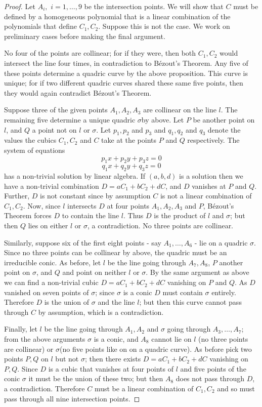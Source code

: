 \documentclass{article}
\theoremstyle{remark}
\begin{document}
\begin{proof}
Let $A_i,$ $i=1,\ldots ,9$ be the intersection points. We will show that $C$ must be defined by a homogeneous polynomial that is a linear combination of the polynomials that define $C_1,C_2$. Suppose this is not the case. We work on preliminary cases before making the final argument.
\par
No four of the points are collinear; for if they were, then both $C_1,C_2$ would intersect the line four times, in contradiction to Bézout's Theorem. Any five of these points determine a quadric curve by the above proposition. This curve is unique; for if two different quadric curves shared these same five points, then they would again contradict Bézout's Theorem.
\par
Suppose three of the given points $A_1,A_2,A_3$ are collinear on the line $l$. The remaining five determine a unique quadric $\sigma$by above. Let $P$ be another point on $l$, and $Q$ a point not on $l$ or $\sigma$. Let $p_1,p_2$ and $p_3$ and $q_1,q_2$ and $q_3$ denote the values the cubics $C_1,C_2$ and $C$ take at the points $P$ and $Q$ respectively. The system of equations 
\pagebreak
\[p_1x+p_2y+p_3z=0\]
\[q_1x+q_2y+q_3z=0 \]
has a non-trivial solution by linear algebra. If $(a,b,d)$ is a solution then we have a non-trivial combination $D=aC_1+bC_2+dC$, and $D$ vanishes at $P$ and $Q$. Further, $D$ is not constant since by assumption $C$ is not a linear combination of $C_1,C_2$. Now, since $l$ intersects $D$ at four points $A_1,A_2,A_3$ and $P$, Bézout's Theorem forces $D$ to contain the line $l$. Thus $D$ is the product of $l$ and $\sigma$; but then $Q$ lies on either $l$ or $\sigma$, a contradiction. No three points are collinear.
\par
Similarly, suppose six of the first eight points - say $A_1,\ldots,A_6$ - lie on a quadric $\sigma$. Since no three points can be collinear by above, the quadric must be an irreducible conic. As before, let $l$ be the line going through $A_7,A_8$, $P$ another point on $\sigma$, and $Q$ and point on neither $l$ or $\sigma$. By the same argument as above we can find a non-trivial cubic $D=aC_1+bC_2+dC$ vanishing on $P$ and $Q$. As $D$ vanished on seven points of $\sigma$; since $\sigma$ is a conic $D$ must contain $\sigma$ entirely. Therefore $D$ is the union of $\sigma$ and the line $l$; but then this curve cannot pass through $C$ by assumption, which is a contradiction.
\par
Finally, let $l$ be the line going through $A_1,A_2$ and $\sigma$ going through $A_3,\ldots,A_7$; from the above arguments $\sigma$ is a conic, and $A_8$ cannot lie on $l$ (no three points are collinear) or $\sigma$(no five points like on on a quadric curve). As before pick two points $P,Q$ on $l$ but not $\sigma$; then there exists $D=aC_1+bC_2+dC$ vanishing on $P,Q$. Since $D$ is a cubic that vanishes at four points of $l$ and five points of the conic $\sigma$ it must be the union of these two; but then $A_8$ does not pass through $D$, a contradiction. Therefore $C$ must be a linear combination of $C_1,C_2$ and so must pass through all nine intersection points.
\end{proof}
\end{document}
